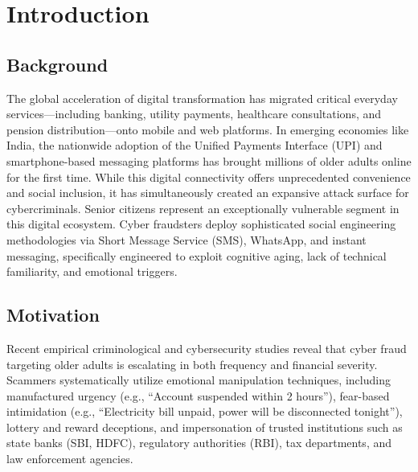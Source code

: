 \documentclass[conference]{IEEEtran}
\begin{document}
\section{Introduction}

\subsection{Background}
The global acceleration of digital transformation has migrated critical everyday services---including banking, utility payments, healthcare consultations, and pension distribution---onto mobile and web platforms. In emerging economies like India, the nationwide adoption of the Unified Payments Interface (UPI) and smartphone-based messaging platforms has brought millions of older adults online for the first time. While this digital connectivity offers unprecedented convenience and social inclusion, it has simultaneously created an expansive attack surface for cybercriminals. Senior citizens represent an exceptionally vulnerable segment in this digital ecosystem. Cyber fraudsters deploy sophisticated social engineering methodologies via Short Message Service (SMS), WhatsApp, and instant messaging, specifically engineered to exploit cognitive aging, lack of technical familiarity, and emotional triggers.

\subsection{Motivation}
Recent empirical criminological and cybersecurity studies reveal that cyber fraud targeting older adults is escalating in both frequency and financial severity. Scammers systematically utilize emotional manipulation techniques, including manufactured urgency (e.g., ``Account suspended within 2 hours''), fear-based intimidation (e.g., ``Electricity bill unpaid, power will be disconnected tonight''), lottery and reward deceptions, and impersonation of trusted institutions such as state banks (SBI, HDFC), regulatory authorities (RBI), tax departments, and law enforcement agencies. 
\end{document}
